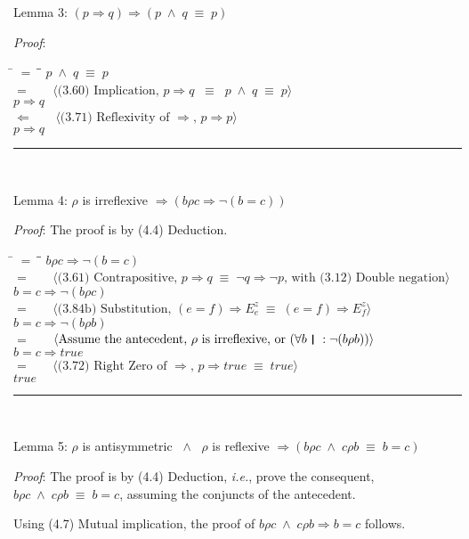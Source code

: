 \documentclass[12pt, fleqn, leqno]{article}
\newcommand{\lgap}{2pt}                             %
\newcommand{\mymathindent}{24pt}                    %
\newcommand{\equivs}{\ensuremath{\;\equiv\;}}       %
\newcommand{\equivss}{\ensuremath{\;\;\equiv\;\;}}  %
\newcommand{\lands}{\ensuremath{\;\land\;}}      %
\newcommand{\impl}{\ensuremath{\Rightarrow}}        %
\newcommand{\foll}{\ensuremath{\Leftarrow}}         %
\newcommand{\myqed}{\rule[-.23ex]{1.2ex}{2.0ex}}
\newcommand{\myqedtab}{\hspace{384pt}}              %
\newcommand{\thedr}{\rule[-.25ex]{.32mm}{1.75ex}}   %
\newcommand{\dr}{\;\,\thedr\,\;}                    %
\newcommand{\rb}{:}                                 %
\newcommand{\all}{\forall}                          %
\newcommand{\Gll} {\langle}                         %
\newcommand{\Ggg} {\rangle}                         %
\newcommand{\Hint}[1]     {\ \ \ $\Gll              \mbox{#1} \Ggg$ }   %
\begin{document}
Lemma 3: $(p \impl q) \impl (p \lands q \equivs p)$

\textit{Proof}:
\begin{tabbing}
\hspace{\mymathindent} \= $= \;$ \= \myqedtab \= \kill
	\> \>  $p \lands q \equivs p$\\
	\> $=$  \>  \Hint{(3.60) Implication, $p \impl q \equivss p \lands q \equivs p$}\\[\lgap]
	\> \>   $p \impl q$\\
	\> $\foll$  \>  \Hint{(3.71) Reflexivity of $\impl$, $p \impl p$}\\[\lgap]
	\> \>   $p \impl q$ \quad \myqed\\
\end{tabbing}

Lemma 4: $\rho$ is irreflexive $\impl (b \rho c \impl \lnot (b = c))$

\textit{Proof}: The proof is by (4.4) Deduction.
\begin{tabbing}
\hspace{\mymathindent} \= $= \;$ \= \myqedtab \= \kill
	\> \>  $b \rho c \impl \lnot (b = c)$\\
	\> $=$  \>  \Hint{(3.61) Contrapositive, $p \impl q \equivs \lnot q \impl \lnot p$, with (3.12) Double negation}\\[\lgap]
	\> \>   $b = c \impl \lnot (b \rho c)$\\
	\> $=$  \>  \Hint{(3.84b) Substitution, $(e = f) \impl E^z_e \equivs (e = f) \impl E^z_f$}\\[\lgap]
	\> \>   $b = c \impl \lnot (b \rho b)$\\
	\> $=$  \>  \Hint{Assume the antecedent, $\rho$ is irreflexive, or $(\all b \dr \rb \lnot (b \rho b))$}\\[\lgap]
	\> \>   $b = c \impl true$\\
	\> $=$  \>  \Hint{(3.72) Right Zero of $\impl$, $p \impl true \equivs true$}\\[\lgap]
	\> \>   $true$ \quad \myqed\\
\end{tabbing}

Lemma 5: $\rho$ is antisymmetric $\lands$ $\rho$ is reflexive $\impl (b \rho c \lands c \rho b \equivs b = c)$

\textit{Proof}: The proof is by (4.4) Deduction, \textit{i.e.}, prove the consequent, $b \rho c \lands c \rho b \equivs b = c$, assuming the conjuncts of the antecedent.

Using (4.7) Mutual implication, the proof of $b \rho c \lands c \rho b \impl b = c$ follows.
\end{document}
